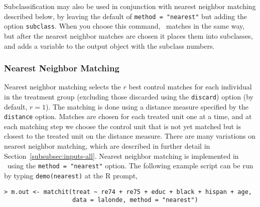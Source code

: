 Subclassification may also be used in conjunction with nearest
neighbor matching described below, by leaving the default of
\texttt{method = "nearest"} but adding the option \texttt{subclass}.
When you choose this command, \MatchIt\ matches in the same way, but
after the nearest neighbor matches are chosen it places them into
subclasses, and adds a variable to the output object with the subclass
numbers.

\subsubsection{Nearest Neighbor Matching}
\label{subsubsec:nearest}

Nearest neighbor matching selects the $r$ best control matches for
each individual in the treatment group (excluding those discarded
using the \texttt{discard}) option (by default, $r=1$).  The matching
is done using a distance measure specified by the {\tt distance}
option. Matches are chosen for each treated unit one at a time, and at
each matching step we choose the control unit that is not yet matched
but is closest to the treated unit on the distance measure.  There are
many variations on nearest neighbor matching, which are described in
further detail in
Section~\ref{subsubsec:inputs-all}.
Nearest neighbor matching is implemented in \MatchIt\ using the
\texttt{method = "nearest"} option.  The following example script can
be run by typing {\tt demo(nearest)} at the R prompt,
\begin{verbatim}
> m.out <- matchit(treat ~ re74 + re75 + educ + black + hispan + age, 
                   data = lalonde, method = "nearest")
\end{verbatim}



